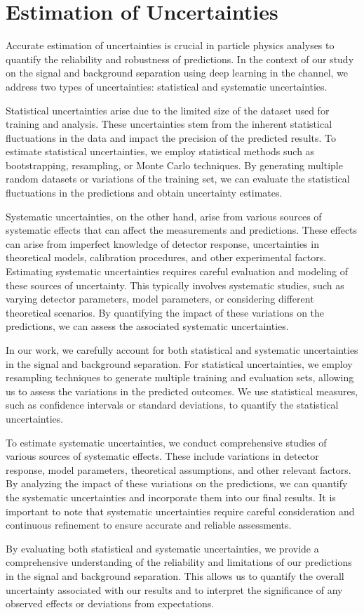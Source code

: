 \section*{Estimation of Uncertainties}

Accurate estimation of uncertainties is crucial in particle physics analyses to quantify the reliability and robustness
of predictions. In the context of our study on the \ttH signal and background separation using deep learning in the \lss
channel, we address two types of uncertainties: statistical and systematic uncertainties.

Statistical uncertainties arise due to the limited size of the dataset used for training and analysis. These
uncertainties stem from the inherent statistical fluctuations in the data and impact the precision of the predicted
results. To estimate statistical uncertainties, we employ statistical methods such as bootstrapping, resampling, or
Monte Carlo techniques. By generating multiple random datasets or variations of the training set, we can evaluate the
statistical fluctuations in the predictions and obtain uncertainty estimates.

Systematic uncertainties, on the other hand, arise from various sources of systematic effects that can affect the
measurements and predictions. These effects can arise from imperfect knowledge of detector response, uncertainties in
theoretical models, calibration procedures, and other experimental factors. Estimating systematic uncertainties requires
careful evaluation and modeling of these sources of uncertainty. This typically involves systematic studies, such as
varying detector parameters, model parameters, or considering different theoretical scenarios. By quantifying the impact
of these variations on the predictions, we can assess the associated systematic uncertainties.

In our work, we carefully account for both statistical and systematic uncertainties in the \ttH signal and background
separation. For statistical uncertainties, we employ resampling techniques to generate multiple training and evaluation
sets, allowing us to assess the variations in the predicted outcomes. We use statistical measures, such as confidence
intervals or standard deviations, to quantify the statistical uncertainties.

To estimate systematic uncertainties, we conduct comprehensive studies of various sources of systematic effects. These
include variations in detector response, model parameters, theoretical assumptions, and other relevant factors. By
analyzing the impact of these variations on the predictions, we can quantify the systematic uncertainties and
incorporate them into our final results. It is important to note that systematic uncertainties require careful
consideration and continuous refinement to ensure accurate and reliable assessments.

By evaluating both statistical and systematic uncertainties, we provide a comprehensive understanding of the reliability
and limitations of our predictions in the \ttH signal and background separation. This allows us to quantify the overall
uncertainty associated with our results and to interpret the significance of any observed effects or deviations from
expectations.